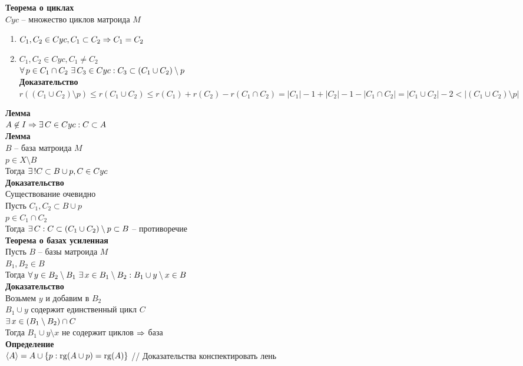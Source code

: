 \documentclass[12pt]{article}
\begin{document}
\textbf{Теорема о циклах}\\
$Cyc$ -- множество циклов матроида $M$
\begin{enumerate}
    \item $C_1, C_2 \in Cyc, C_1 \subset C_2 \Rightarrow C_1 = C_2$
    \item $C_1, C_2 \in Cyc, C_1 \neq C_2$\\
    $\forall\, p \in C_1 \cap C_2\ \exists\, C_3 \in Cyc: C_3 \subset (C_1 \cup C_2)\setminus p$\\
    \textbf{Доказательство}\\
    $r((C_1 \cup C_2)\setminus p) \leq r(C_1 \cup C_2) \leq r(C_1) + r(C_2) - r(C_1 \cap C_2) = |C_1| - 1 + |C_2| - 1 - |C_1 \cap C_2| = |C_1 \cup C_2| - 2 < |(C_1 \cup C_2) \setminus p|$
\end{enumerate}
\textbf{Лемма}\\
$A \not\in I \Rightarrow \exists\, C \in Cyc: C \subset A$\\
\textbf{Лемма}\\
$B$ -- база матроида $M$\\
$p \in X \setminus B$\\
Тогда $\exists\, ! C \subset B \cup p, C \in Cyc$\\
\textbf{Доказательство}\\
Существование очевидно\\
Пусть $C_1, C_2 \subset B \cup p$\\
$p \in C_1 \cap C_2$\\
Тогда $\exists\, C: C \subset (C_1 \cup C_2) \setminus p \subset B$ -- противоречие\\
\textbf{Теорема о базах усиленная}\\
Пусть $B$ -- базы матроида $M$\\
$B_1, B_2 \in B$\\
Тогда $\forall\, y\in B_2 \setminus B_1\ \exists\, x \in B_1 \setminus B_2: B_1 \cup y \setminus x \in B$\\
\textbf{Доказательство}\\
Возьмем $y$ и добавим в $B_2$\\
$B_1 \cup y$ содержит единственный цикл $C$\\
$\exists\, x \in (B_1 \setminus B_2) \cap C$\\
Тогда $B_1 \cup y \setminus x$ не содержит циклов $\Rightarrow$ база\\
\textbf{Определение}\\
$\langle A \rangle = A \cup \{p: \operatorname{rg} (A \cup p) = \operatorname{rg} (A)\}$
// Доказательства конспектировать лень
\end{document}
